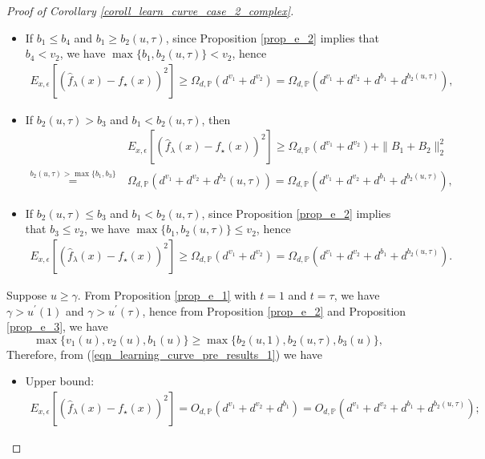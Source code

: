 \documentclass{article}
\theoremstyle{plain}
\theoremstyle{definition}
\theoremstyle{remark}
\begin{document}
\begin{appendix}
\begin{proof}[Proof of Corollary \ref{coroll_learn_curve_case_2_complex}]
\begin{itemize}
\begin{itemize}
\item If $b_1 \leq b_4$ and $b_1 \geq b_2(u, \tau)$, since Proposition \ref{prop_e_2} implies that $b_4<v_2$, we have $\max\{b_1, b_2(u, \tau)\}<v_2$, hence
\begin{align*}
E_{x, \epsilon} \left[ \left(\hat{f}_{\lambda}(x) - f_{\star}(x) \right)^{2} \right]
\geq
\Omega_{d, \mathbb{P}} \left( d^{v_1} + d^{v_2}\right)
=
\Omega_{d, \mathbb{P}} \left( d^{v_1} + d^{v_2} + d^{b_1} + d^{b_2(u, \tau)}\right),
\end{align*}


\item If $b_2(u, \tau)>b_3$ and $b_1 < b_2(u, \tau)$, then
\begin{align*}
&~ E_{x, \epsilon} \left[ \left(\hat{f}_{\lambda}(x) - f_{\star}(x) \right)^{2} \right]
\geq   \Omega_{d, \mathbb{P}} \left( d^{v_1} + d^{v_2} \right) + \|B_1+B_2\|_{2}^{2}\\
\overset{b_2(u, \tau)>\max\{b_1, b_3\}}{=} &~
\Omega_{d, \mathbb{P}} \left( d^{v_1} + d^{v_2} + d^{b_2}(u, \tau)\right)
=
\Omega_{d, \mathbb{P}} \left( d^{v_1} + d^{v_2} + d^{b_1} + d^{b_2(u, \tau)}\right),
\end{align*}

\item If $b_2(u, \tau) \leq b_3$ and $b_1 < b_2(u, \tau)$, since Proposition \ref{prop_e_2} implies that $b_3 \leq v_2$, we have $\max\{b_1, b_2(u, \tau)\} \leq v_2$, hence
\begin{align*}
E_{x, \epsilon} \left[ \left(\hat{f}_{\lambda}(x) - f_{\star}(x) \right)^{2} \right]
\geq  \Omega_{d, \mathbb{P}} \left( d^{v_1} + d^{v_2} \right) 
=
\Omega_{d, \mathbb{P}} \left( d^{v_1} + d^{v_2} + d^{b_1} + d^{b_2(u, \tau)}\right).
\end{align*}
    \end{itemize}

\end{itemize}

 Suppose $u \geq \gamma$. From Proposition \ref{prop_e_1}  with $t=1$ and $t=\tau$, we have $\gamma > u^{\prime}(1)$ and $\gamma > u^{\prime}(\tau)$, hence from Proposition \ref{prop_e_2} and Proposition \ref{prop_e_3}, we have
\begin{equation*}
    \max\{v_1(u), v_2(u), b_1(u)\} \geq \max\{b_2(u, 1), b_2(u, \tau), b_3(u)\},
\end{equation*}
Therefore, from (\ref{eqn_learning_curve_pre_results_1}) we have
\begin{itemize}
    \item Upper bound:
    \begin{align*}
E_{x, \epsilon} \left[ \left(\hat{f}_{\lambda}(x) - f_{\star}(x) \right)^{2} \right]
=
O_{d, \mathbb{P}} \left( d^{v_1} + d^{v_2} + d^{b_1}\right)
=
O_{d, \mathbb{P}} \left( d^{v_1} + d^{v_2} + d^{b_1} + d^{b_2(u, \tau)}\right);
\end{align*}


\end{itemize}
\end{proof}
\end{appendix}
\end{document}
